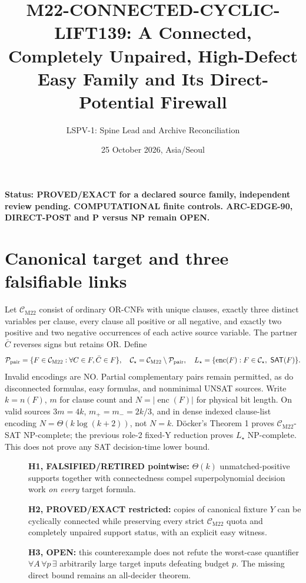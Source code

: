 \documentclass[11pt]{article}
\title{M22-CONNECTED-CYCLIC-LIFT139: A Connected, Completely Unpaired, High-Defect Easy Family and Its Direct-Potential Firewall}
\author{LSPV-1: Spine Lead and Archive Reconciliation}
\date{25 October 2026, Asia/Seoul}
\newcommand{\CM}{\mathcal C_{\mathrm{M22}}}
\newcommand{\Cs}{\mathcal C_\star}
\newcommand{\SAT}{\mathsf{SAT}}
\begin{document}
\maketitle
\noindent\textbf{Status: PROVED/EXACT for a declared source family, independent review pending. COMPUTATIONAL finite controls. ARC-EDGE-90, DIRECT-POST and P versus NP remain OPEN.}

\section{Canonical target and three falsifiable links}
Let \(\CM\) consist of ordinary OR-CNFs with unique clauses, exactly three distinct variables per clause, every clause all positive or all negative, and exactly two positive and two negative occurrences of each active source variable. The partner \(\bar C\) reverses signs but retains OR. Define
\[
\mathcal P_{\rm pair}=\{F\in\CM:\forall C\in F,\bar C\in F\},\quad
\Cs=\CM\setminus\mathcal P_{\rm pair},\quad
L_\star=\{\operatorname{enc}(F):F\in\Cs,\ \SAT(F)\}.
\]
Invalid encodings are NO. Partial complementary pairs remain permitted, as do disconnected formulas, easy formulas, and nonminimal UNSAT sources. Write \(k=n(F)\), \(m\) for clause count and \(N=|\operatorname{enc}(F)|\) for physical bit length. On valid sources \(3m=4k\), \(m_+=m_-=2k/3\), and in dense indexed clause-list encoding \(N=\Theta(k\log(k+2))\), not \(N=k\). D\"ocker's Theorem 1 proves \(\CM\)-SAT NP-complete; the previous role-2 fixed-Y reduction proves \(L_\star\) NP-complete. This does not prove any SAT decision-time lower bound.

\begin{description}
\item[] \textbf{H1, FALSIFIED/RETIRED pointwise:} \(\Theta(k)\) unmatched-positive supports together with connectedness compel superpolynomial decision work \emph{on every} target formula.
\item[] \textbf{H2, PROVED/EXACT restricted:} copies of canonical fixture \(Y\) can be cyclically connected while preserving every strict \(\CM\) quota and completely unpaired support status, with an explicit easy witness.
\item[] \textbf{H3, OPEN:} this counterexample does not refute the worst-case quantifier \(\forall A\,\forall p\,\exists\) arbitrarily large target inputs defeating budget \(p\). The missing direct bound remains an all-decider theorem.
\end{description}
\end{document}
